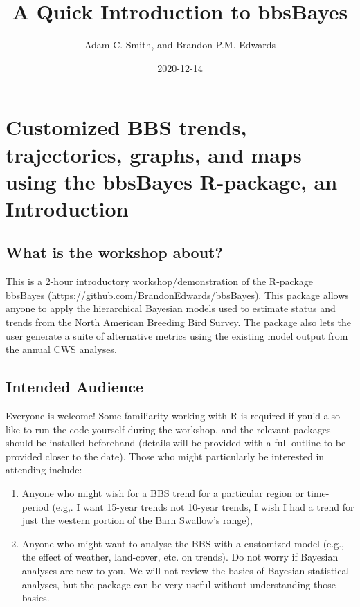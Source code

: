 \documentclass[
]{book}
\title{A Quick Introduction to bbsBayes}
\author{Adam C. Smith, and Brandon P.M. Edwards}
\date{2020-12-14}
\begin{document}
\maketitle

{
\setcounter{tocdepth}{1}
\tableofcontents
}
\hypertarget{customized-bbs-trends-trajectories-graphs-and-maps-using-the-bbsbayes-r-package-an-introduction}{%
\chapter{Customized BBS trends, trajectories, graphs, and maps using the bbsBayes R-package, an Introduction}\label{customized-bbs-trends-trajectories-graphs-and-maps-using-the-bbsbayes-r-package-an-introduction}}

\hypertarget{what-is-the-workshop-about}{%
\section{What is the workshop about?}\label{what-is-the-workshop-about}}

This is a 2-hour introductory workshop/demonstration of the R-package
bbsBayes (\url{https://github.com/BrandonEdwards/bbsBayes}). This package
allows anyone to apply the hierarchical Bayesian models used to estimate
status and trends from the North American Breeding Bird Survey. The
package also lets the user generate a suite of alternative metrics using
the existing model output from the annual CWS analyses.

\hypertarget{intended-audience}{%
\section{Intended Audience}\label{intended-audience}}

Everyone is welcome! Some familiarity working with R is required if
you'd also like to run the code yourself during the workshop, and the
relevant packages should be installed beforehand (details will be
provided with a full outline to be provided closer to the date). Those
who might particularly be interested in attending include:

\begin{enumerate}
\def\labelenumi{\arabic{enumi}.}
\item
  Anyone who might wish for a BBS trend for a particular region or
  time-period (e.g,. I want 15-year trends not 10-year trends, I wish
  I had a trend for just the western portion of the Barn Swallow's
  range),
\item
  Anyone who might want to analyse the BBS with a customized model
  (e.g., the effect of weather, land-cover, etc. on trends). Do not
  worry if Bayesian analyses are new to you. We will not review the
  basics of Bayesian statistical analyses, but the package can be very
  useful without understanding those basics.
\end{enumerate}
\end{document}
